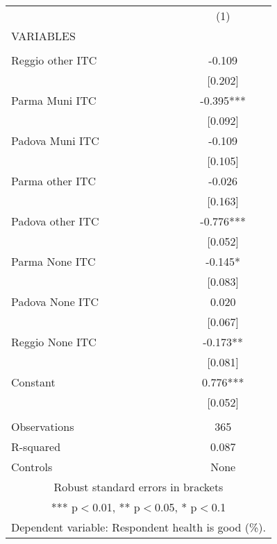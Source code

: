 \begin{tabular}{lc} \hline
 & (1) \\
VARIABLES &  \\ \hline
 &  \\
Reggio other ITC & -0.109 \\
 & [0.202] \\
Parma Muni ITC & -0.395*** \\
 & [0.092] \\
Padova Muni ITC & -0.109 \\
 & [0.105] \\
Parma other ITC & -0.026 \\
 & [0.163] \\
Padova other ITC & -0.776*** \\
 & [0.052] \\
Parma None ITC & -0.145* \\
 & [0.083] \\
Padova None ITC & 0.020 \\
 & [0.067] \\
Reggio None ITC & -0.173** \\
 & [0.081] \\
Constant & 0.776*** \\
 & [0.052] \\
 &  \\
Observations & 365 \\
R-squared & 0.087 \\
 Controls & None \\ \hline
\multicolumn{2}{c}{ Robust standard errors in brackets} \\
\multicolumn{2}{c}{ *** p$<$0.01, ** p$<$0.05, * p$<$0.1} \\
\multicolumn{2}{c}{ Dependent variable: Respondent health is good (\%).} \\
\end{tabular}
